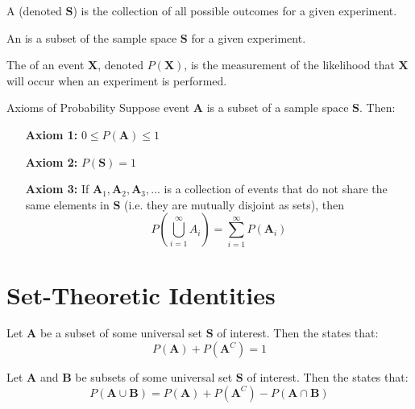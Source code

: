 \documentclass[12pt]{report}
\begin{document}
\begin{defn}{}{}
    A  (denoted $\mathbf{S}$) is the collection of all possible outcomes for a given experiment.
\end{defn}

\begin{defn}{}{}
    An  is a subset of the sample space $\mathbf{S}$ for a given experiment.
\end{defn}


\begin{defn}{}{}
    The  of an event $\mathbf{X}$, denoted $P(\mathbf{X})$, is the measurement of the likelihood that $\mathbf{X}$ will occur when an experiment is performed.
\end{defn}

\begin{cust*}[separator sign = {}]{Axioms of Probability}{}
    Suppose event $\mathbf{A}$ is a subset of a sample space $\mathbf{S}$. Then:\begin{itemize}[leftmargin = 1in]
        \item[\textbf{Axiom 1:}] $0\leq P(\mathbf{A})\leq 1$
        \item[\textbf{Axiom 2:}] $P(\mathbf{S}) = 1$
        \item[\textbf{Axiom 3:}] If $\mathbf{A}_1,\mathbf{A}_2,\mathbf{A}_3,...$ is a collection of events that do not share the same elements in $\mathbf{S}$ (i.e. they are mutually disjoint as sets), then \begin{equation*}
                P\left(\bigcup\limits_{i=1}^{\infty}A_i\right) = \sum\limits_{i=1}^{\infty}P(\mathbf{A}_i)
        \end{equation*}
    \end{itemize}
\end{cust*}


\section{Set-Theoretic Identities}


\begin{prop}{}{}
    Let $\mathbf{A}$ be a subset of some universal set $\mathbf{S}$ of interest. Then the  states that: \begin{equation*}
        P(\mathbf{A}) + P(\mathbf{A}^C) = 1
    \end{equation*}
\end{prop}


\begin{prop}{}{}
    Let $\mathbf{A}$ and $\mathbf{B}$ be subsets of some universal set $\mathbf{S}$ of interest. Then the  states that: \begin{equation*}
        P(\mathbf{A}\cup\mathbf{B}) = P(\mathbf{A}) + P(\mathbf{A}^C) - P(\mathbf{A}\cap\mathbf{B})
    \end{equation*}
\end{prop}
\end{document}

